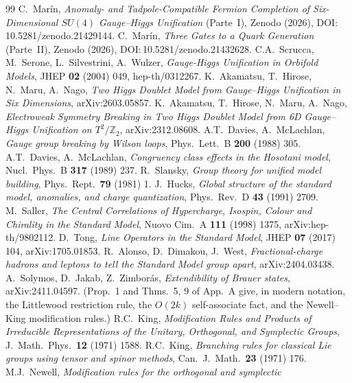 \documentclass[11pt,a4paper]{article}
\newcommand{\ZZ}{\mathbb{Z}}
\begin{document}
\begin{thebibliography}{99}
 C.~Mar\'in, \emph{Anomaly- and Tadpole-Compatible Fermion Completion of
Six-Dimensional $SU(4)$ Gauge--Higgs Unification} (Parte~I), Zenodo (2026),
DOI:\,10.5281/zenodo.21429144.
 C.~Mar\'in, \emph{Three Gates to a Quark Generation} (Parte~II), Zenodo
(2026), DOI:\,10.5281/zenodo.21432628.
 C.A.~Scrucca, M.~Serone, L.~Silvestrini, A.~Wulzer, \emph{Gauge-Higgs
Unification in Orbifold Models}, JHEP \textbf{02} (2004) 049, hep-th/0312267.
 K.~Akamatsu, T.~Hirose, N.~Maru, A.~Nago, \emph{Two Higgs Doublet Model from
Gauge--Higgs Unification in Six Dimensions}, arXiv:2603.05857.
 K.~Akamatsu, T.~Hirose, N.~Maru, A.~Nago, \emph{Electroweak Symmetry Breaking
in Two Higgs Doublet Model from 6D Gauge--Higgs Unification on $T^2/\ZZ_2$},
arXiv:2312.08608.
 A.T.~Davies, A.~McLachlan, \emph{Gauge group breaking by Wilson
loops}, Phys.\ Lett.\ B \textbf{200} (1988) 305.
 A.T.~Davies, A.~McLachlan, \emph{Congruency class effects in the
Hosotani model}, Nucl.\ Phys.\ B \textbf{317} (1989) 237.
 R.~Slansky, \emph{Group theory for unified model building},
Phys.\ Rept.\ \textbf{79} (1981) 1.
 J.~Hucks, \emph{Global structure of the standard model, anomalies, and
charge quantization}, Phys.\ Rev.\ D \textbf{43} (1991) 2709.
 M.~Saller, \emph{The Central Correlations of Hypercharge, Isospin, Colour
and Chirality in the Standard Model}, Nuovo Cim.\ A \textbf{111} (1998) 1375,
arXiv:hep-th/9802112.
 D.~Tong, \emph{Line Operators in the Standard Model}, JHEP \textbf{07}
(2017) 104, arXiv:1705.01853.
 R.~Alonso, D.~Dimakou, J.~West, \emph{Fractional-charge hadrons and
leptons to tell the Standard Model group apart}, arXiv:2404.03438.
 A.~Solymos, D.~Jakab, Z.~Zimbor\'as, \emph{Extendibility of Brauer states},
arXiv:2411.04597. (Prop.~1 and Thms.~5, 9 of App.~A give, in modern notation, the Littlewood
restriction rule, the $O(2k)$ self-associate fact, and the Newell--King modification rules.)
 R.C.~King, \emph{Modification Rules and Products of Irreducible
Representations of the Unitary, Orthogonal, and Symplectic Groups}, J.\ Math.\ Phys.\
\textbf{12} (1971) 1588.
 R.C.~King, \emph{Branching rules for classical Lie groups using tensor and
spinor methods}, Can.\ J.\ Math.\ \textbf{23} (1971) 176.
 M.J.~Newell, \emph{Modification rules for the orthogonal and symplectic
}
\end{thebibliography}
\end{document}
